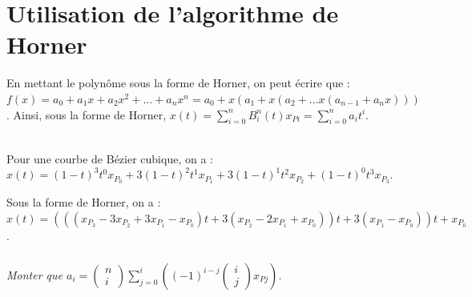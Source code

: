 \documentclass[10pt,fleqn]{article} %
\begin{document}
%
%
%
%


\section{Utilisation de l'algorithme de Horner}


%
En mettant le polynôme sous la forme de Horner, on peut écrire que : 
$f(x)=a_0 + a_1 x + a_2 x^2 +...+ a_n x^n = a_0 + x\left( a_1  + x \left( a_2+ ...
x \left(a_{n-1} +a_n x\right)\right)\right)$. Ainsi, sous la forme de Horner, $x(t)= \sum\limits_{i=0}^{n} B_i^n(t) x_{Pi} = \sum\limits_{i=0}^{n} a_i t^i$.


\begin{exemple}~\\

Pour une courbe de Bézier cubique, on a : $x(t)=  \left(1-t \right)^3 t^0 x_{P_0} +3\left(1-t \right)^2 t^1 x_{P_1} +3\left(1-t \right)^1 t^2 x_{P_2} +\left(1-t \right)^0 t^3 x_{P_3}$.

Sous la forme de Horner, on a : $x(t)=\left(\left(\left(x_{P_3}-3x_{P_2}+3x_{P_1}-x_{P_0}\right)t+3\left(x_{P_2}-2x_{P_1}+x_{P_0}\right)\right)t+3\left( x_{P_1}-x_{P_0}\right)\right)t+x_{P_0}$.
\end{exemple}



\subparagraph{}
\textit{Monter que $a_i = 
\begin{pmatrix} n \\ i \end{pmatrix} \sum\limits_{j=0}^{i} \left( \left(-1\right)^{i-j} 
\begin{pmatrix} i \\ j
\end{pmatrix}x_{Pj} \right)$.}
\end{document}
